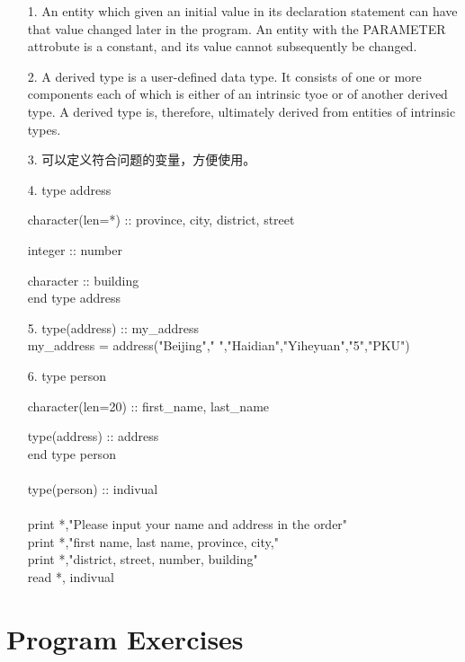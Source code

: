 \documentclass[a4paper,titlepage]{report}
\theoremstyle{definition}
\begin{document}
\begin{itemize}
  \item[1.]
  An entity which given an initial value in its declaration statement can have that value changed later in the program. An entity with the PARAMETER attrobute is a constant, and its value cannot subsequently be changed.

  \item[2.]
  A derived type is a user-defined data type. It consists of one or more components each of which is either of an intrinsic tyoe or of another derived type. A derived type is, therefore, ultimately derived from entities of intrinsic types.

  \item[3.]
  可以定义符合问题的变量，方便使用。

  \item[4.]
  type address \par
  \setlength{\parindent}{3ex}
  character(len=*) :: province, city, district, street \par
  integer :: number \par
  character :: building \\
  end type address

  \item[5.]
  type(address) :: my\_address \\
  my\_address = address("Beijing"," ","Haidian","Yiheyuan","5","PKU")

  \item[6.]
  type person \par
  character(len=20) :: first\_name, last\_name \par
  type(address) :: address \\
  end type person \\ \\
  type(person) :: indivual \\ \\
  print *,"Please input your name and address in the order" \\
  print *,"first name, last name, province, city," \\
  print *,"district, street, number, building" \\
  read *, indivual

\end{itemize}


\section*{Program Exercises}
\end{document}
